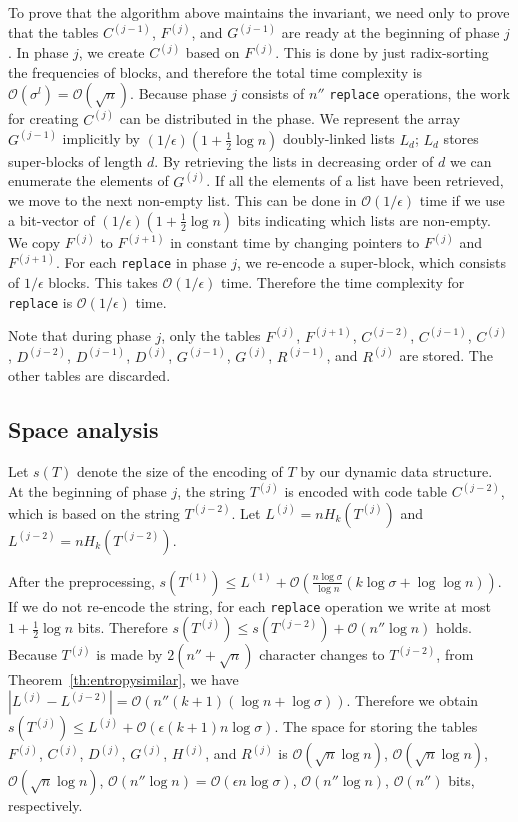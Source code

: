 \documentclass{llncs}
\newcommand{\Order}{\mathcal{O}}
\begin{document}
To prove that the algorithm above maintains the invariant, we need only to prove
that the tables $C^{(j-1)}$, $F^{(j)}$, and $G^{(j-1)}$
are ready at the beginning of phase $j$.
In phase $j$, we create $C^{(j)}$ based on $F^{(j)}$.  
This is done by just radix-sorting
the frequencies of blocks, and therefore the total time complexity is
$\Order(\sigma^l) = \Order(\sqrt{n})$.
Because phase $j$ consists of 
$n''$ \texttt{replace} operations, the work for creating $C^{(j)}$
can be distributed in the phase.
We represent the array $G^{(j-1)}$ implicitly by 
$(1/\epsilon)(1+\frac{1}{2}\log n)$ doubly-linked lists $L_d$; 
$L_d$ stores super-blocks of length $d$.  By retrieving the lists 
in decreasing order of $d$ we can
enumerate the elements of $G^{(j)}$.  If all the elements of a list have been
retrieved, we move to the next non-empty list.  This can be done in 
$\Order(1/\epsilon)$ time if we use a bit-vector of
$(1/\epsilon)(1+\frac{1}{2}\log n)$ bits indicating which lists are non-empty.
We copy $F^{(j)}$ to $F^{(j+1)}$ in constant time
by changing pointers to $F^{(j)}$ and $F^{(j+1)}$.
For each \texttt{replace} in phase $j$, 
we re-encode a super-block, which consists of
$1/\epsilon$ blocks.  This takes $\Order(1/\epsilon)$ time.
Therefore the time complexity for \texttt{replace} is $\Order(1/\epsilon)$ time.

Note that during phase $j$, only the tables
$F^{(j)}$, $F^{(j+1)}$, 
$C^{(j-2)}$, $C^{(j-1)}$, $C^{(j)}$, 
$D^{(j-2)}$, $D^{(j-1)}$, $D^{(j)}$, 
$G^{(j-1)}$, $G^{(j)}$, 
$R^{(j-1)}$, and $R^{(j)}$
are stored.
The other tables are discarded.


\subsection{Space analysis}\label{sec:space}

Let $s(T)$ denote the size of the encoding of $T$ by our dynamic data structure.
At the beginning of phase $j$, the string $T^{(j)}$ is encoded with
code table $C^{(j-2)}$, which is based on the string $T^{(j-2)}$.
Let $L^{(j)} = nH_k(T^{(j)})$ and $L^{(j-2)} = nH_k(T^{(j-2)})$.

After the preprocessing,
$s(T^{(1)}) \le L^{(1)} + \Order\left(\frac{n\log\sigma}{\log n}(k\log\sigma+\log\log n)\right)$.
If we do not re-encode the string, for each \texttt{replace} operation we write at most
$1+\frac{1}{2}\log n$ bits.  Therefore $s(T^{(j)}) \le s(T^{(j-2)}) +\Order(n''\log n)$ holds.
Because $T^{(j)}$ is made by $2(n''+\sqrt{n})$ character changes to $T^{(j-2)}$,
from Theorem~\ref{th:entropysimilar}, we have
$ |L^{(j)} - L^{(j-2)}| = \Order(n'' (k+1)(\log n+\log\sigma))$.
Therefore we obtain
$s(T^{(j)}) \le L^{(j)} + \Order(\epsilon(k+1)n\log\sigma)$.
The space for storing the tables $F^{(j)}$, $C^{(j)}$, $D^{(j)}$, $G^{(j)}$,
$H^{(j)}$, and $R^{(j)}$ is
$\Order(\sqrt{n}\log n)$, $\Order(\sqrt{n}\log n)$, $\Order(\sqrt{n}\log n)$,
$\Order(n'' \log n) = \Order(\epsilon n \log\sigma)$,
$\Order(n'' \log n)$,
$\Order(n'')$ bits, respectively.
\end{document}
